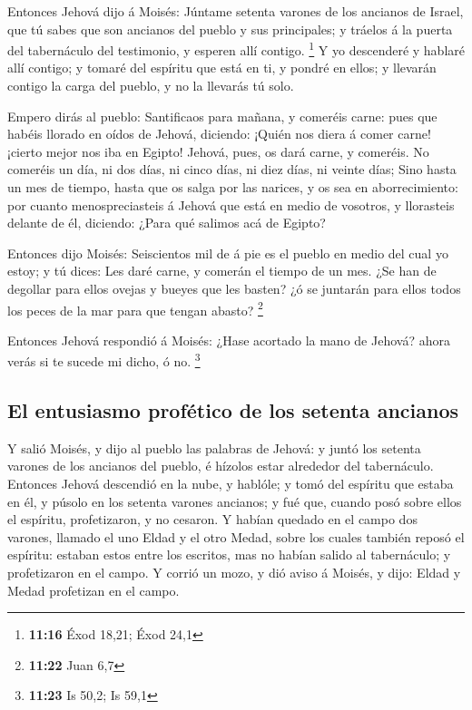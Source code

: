  Entonces Jehová dijo á Moisés: Júntame setenta varones de
los ancianos de Israel, que tú sabes que son ancianos del pueblo y sus
principales; y tráelos á la puerta del tabernáculo del testimonio, y
esperen allí contigo. \footnote{\textbf{11:16} Éxod 18,21; Éxod 24,1}
 Y yo descenderé y hablaré allí contigo; y tomaré del
espíritu que está en ti, y pondré en ellos; y llevarán contigo la carga
del pueblo, y no la llevarás tú solo.

 Empero dirás al pueblo: Santificaos para mañana, y
comeréis carne: pues que habéis llorado en oídos de Jehová, diciendo:
¡Quién nos diera á comer carne! ¡cierto mejor nos iba en Egipto! Jehová,
pues, os dará carne, y comeréis.  No comeréis un día, ni
dos días, ni cinco días, ni diez días, ni veinte días; 
Sino hasta un mes de tiempo, hasta que os salga por las narices, y os
sea en aborrecimiento: por cuanto menospreciasteis á Jehová que está en
medio de vosotros, y llorasteis delante de él, diciendo: ¿Para qué
salimos acá de Egipto?

 Entonces dijo Moisés: Seiscientos mil de á pie es el
pueblo en medio del cual yo estoy; y tú dices: Les daré carne, y comerán
el tiempo de un mes.  ¿Se han de degollar para ellos ovejas
y bueyes que les basten? ¿ó se juntarán para ellos todos los peces de la
mar para que tengan abasto? \footnote{\textbf{11:22} Juan 6,7}

 Entonces Jehová respondió á Moisés: ¿Hase acortado la mano
de Jehová? ahora verás si te sucede mi dicho, ó no. \footnote{\textbf{11:23}
  Is 50,2; Is 59,1}

\hypertarget{el-entusiasmo-profuxe9tico-de-los-setenta-ancianos}{%
\subsection{El entusiasmo profético de los setenta
ancianos}\label{el-entusiasmo-profuxe9tico-de-los-setenta-ancianos}}

 Y salió Moisés, y dijo al pueblo las palabras de Jehová: y
juntó los setenta varones de los ancianos del pueblo, é hízolos estar
alrededor del tabernáculo.  Entonces Jehová descendió en la
nube, y hablóle; y tomó del espíritu que estaba en él, y púsolo en los
setenta varones ancianos; y fué que, cuando posó sobre ellos el
espíritu, profetizaron, y no cesaron.  Y habían quedado en
el campo dos varones, llamado el uno Eldad y el otro Medad, sobre los
cuales también reposó el espíritu: estaban estos entre los escritos, mas
no habían salido al tabernáculo; y profetizaron en el campo.
 Y corrió un mozo, y dió aviso á Moisés, y dijo: Eldad y
Medad profetizan en el campo.

